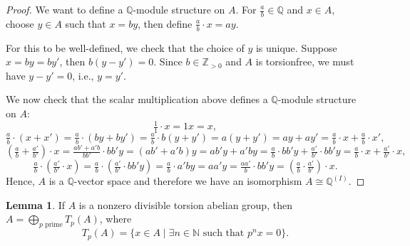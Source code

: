 \documentclass[12pt]{article}
\theoremstyle{definition}
\newtheorem{lemma}{Lemma}
\newcommand{\N}{\mathbb{N}}
\newcommand{\Z}{\mathbb{Z}}
\newcommand{\Q}{\mathbb{Q}}
\newcommand{\<}{\langle}
\renewcommand{\>}{\rangle}
\newcommand{\iso}{\cong}
\renewcommand{\_}[1]{{_{#1}}}
\begin{document}
\begin{proof}
    We want to define a $\Q$-module structure on $A$.
    For $\frac{a}{b} \in \Q$ and $x \in A$, choose $y \in A$ such that $x = by$, then define $\frac{a}{b} \cdot x = ay$.

    For this to be well-defined, we check that the choice of $y$ is unique.
    Suppose $x = by = by'$, then $b(y - y') = 0$.
    Since $b \in \Z_{>0}$ and $A$ is torsionfree, we must have $y - y' = 0$, i.e., $y = y'$.

    We now check that the scalar multiplication above defines a $\Q$-module structure on $A$:
    \[
        \tfrac{1}{1} \cdot x = 1x = x,
    \]
    \[
        \tfrac{a}{b} \cdot (x + x') 
        = \tfrac{a}{b} \cdot (by + by') 
        = \tfrac{a}{b} \cdot b(y + y') 
        = a(y + y') = ay + ay' 
        = \tfrac{a}{b} \cdot x + \tfrac{a}{b} \cdot x',
    \]
    \[
        (\tfrac{a}{b} + \tfrac{a'}{b'}) \cdot x
        = \tfrac{ab' + a'b}{bb'} \cdot bb'y
        = (ab' + a'b)y
        = ab'y + a'by
        = \tfrac{a}{b} \cdot bb'y + \tfrac{a'}{b'} \cdot bb'y
        = \tfrac{a}{b} \cdot x + \tfrac{a'}{b'} \cdot x,
    \]
    \[
        \tfrac{a}{b} \cdot (\tfrac{a'}{b'} \cdot x)
        = \tfrac{a}{b} \cdot (\tfrac{a'}{b'} \cdot bb'y)
        = \tfrac{a}{b} \cdot a'by
        = aa'y
        = \tfrac{aa'}{b} \cdot bb'y
        = (\tfrac{a}{b} \cdot \tfrac{a'}{b'}) \cdot x.
    \]
    Hence, $A$ is a $\Q$-vector space and therefore we have an isomorphism $A \iso \Q^{(I)}$.
\end{proof}

\begin{lemma}\label{lem:tor_decomp}
    If $A$ is a nonzero divisible torsion abelian group, then $A = \bigoplus_{p \text{ prime}} T_p(A)$, where
    \[
        T_p(A) = \{x \in A \mid \exists n \in \N \text{ such that } p^nx = 0\}.
    \]
\end{lemma}
\end{document}
